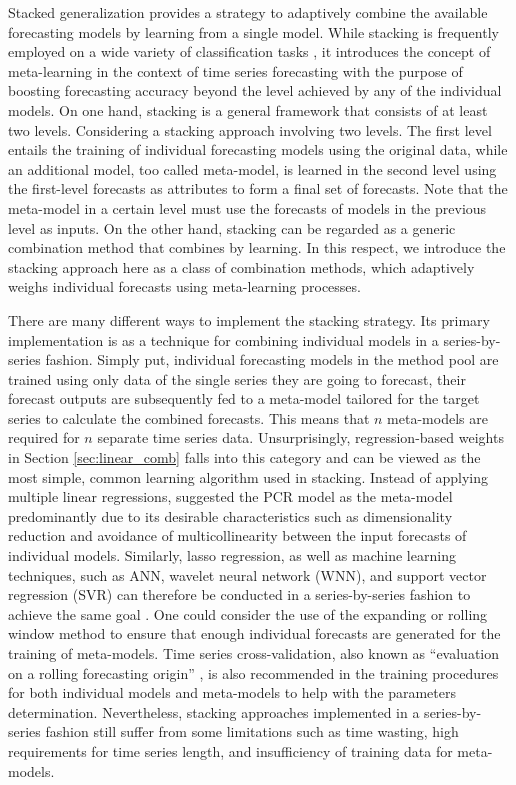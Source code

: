 \documentclass[11pt]{article}
\begin{document}
Stacked generalization \citep[stacking,][]{Wolpert1992-if} provides a strategy to adaptively combine the available forecasting models by learning from a single model. While stacking is frequently employed on a wide variety of classification tasks \citep{Zhou2012-cy}, it introduces the concept of meta-learning in the context of time series forecasting with the purpose of boosting forecasting accuracy beyond the level achieved by any of the individual models. On one hand, stacking is a general framework that consists of at least two levels. Considering a stacking approach involving two levels. The first level entails the training of individual forecasting models using the original data, while an additional model, too called meta-model, is learned in the second level using the first-level forecasts as attributes to form a final set of forecasts. Note that the meta-model in a certain level must use the forecasts of models in the previous level as inputs. On the other hand, stacking can be regarded as a generic combination method that combines by learning. In this respect, we introduce the stacking approach here as a class of combination methods, which adaptively weighs individual forecasts using meta-learning processes.

There are many different ways to implement the stacking strategy. Its primary implementation is as a technique for combining individual models in a series-by-series fashion. Simply put, individual forecasting models in the method pool are trained using only data of the single series they are going to forecast, their forecast outputs are subsequently fed to a meta-model tailored for the target series to calculate the combined forecasts. This means that $n$ meta-models are required for $n$ separate time series data. Unsurprisingly, regression-based weights in Section \ref{sec:linear_comb} \citep[e.g.,][]{Granger1984-jc,Gunter1992-go} falls into this category and can be viewed as the most simple, common learning algorithm used in stacking. Instead of applying multiple linear regressions, \citet{Moon2020-ls} suggested the PCR model as the meta-model predominantly due to its desirable characteristics such as dimensionality reduction and avoidance of multicollinearity between the input forecasts of individual models. Similarly, lasso regression, as well as machine learning techniques, such as ANN, wavelet neural network (WNN), and support vector regression (SVR) can therefore be conducted in a series-by-series fashion to achieve the same goal \citep[e.g.,][]{Donaldson1996-um,Conflitti2015-fq,Ribeiro2019-wk,Ribeiro2020-mj}. One could consider the use of the expanding or rolling window method to ensure that enough individual forecasts are generated for the training of meta-models. Time series cross-validation, also known as ``evaluation on a rolling forecasting origin'' \citep{Hyndman2021-tx}, is also recommended in the training procedures for both individual models and meta-models to help with the parameters determination. Nevertheless, stacking approaches implemented in a series-by-series fashion still suffer from some limitations such as time wasting, high requirements for time series length, and insufficiency of training data for meta-models.
\end{document}
